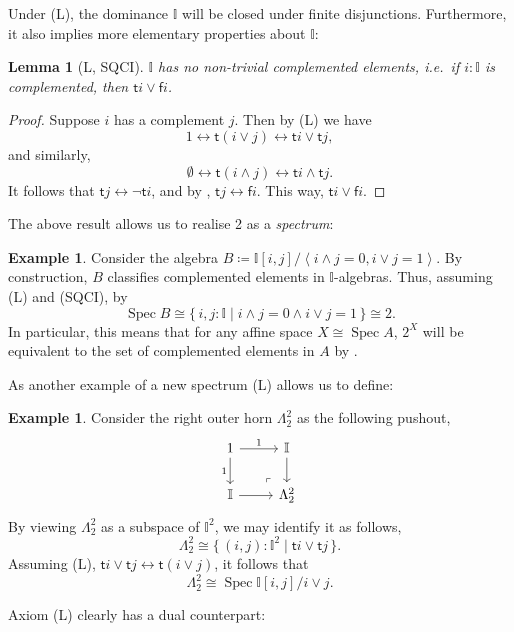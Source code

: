 \documentclass[a4paper,12pt]{amsart}
\newtheorem{lemma}[theorem]{Lemma}
\theoremstyle{definition}
\newtheorem{example}[theorem]{Example}
\newcommand{\mbb}[1]{\mathbb{#1}}
\newcommand{\I}{\mbb I}
\newcommand{\ms}[1]{\mathsf{#1}}
\newcommand{\pair}[1]{\left\langle#1\right\rangle}
\newcommand{\scomp}[2]{\{\,#1\mid#2\,\}}
\newcommand{\emp}{\emptyset}
\newcommand{\eq}{\leftrightarrow}
\newcommand{\spec}{\operatorname{Spec}}
\begin{document}
Under (L), the dominance $\I$ will be closed under finite disjunctions. Furthermore, it also implies more elementary properties about $\I$:

\begin{lemma}[L, SQCI]\label{lem:intisnotBoolean}
  $\I$ has no non-trivial complemented elements, i.e.\ if $i : \I$ is complemented, then $\ms ti \vee \ms fi$. 
\end{lemma}
\begin{proof}
  Suppose $i$ has a complement $j$. Then by (L) we have
  \[ 1 \eq \ms t(i \vee j) \eq \ms ti \vee \ms tj, \]
  and similarly,
  \[ \emp \eq \ms t(i \wedge j) \eq \ms ti \wedge \ms tj. \]
  It follows that $\ms tj \eq \neg \ms ti$, and by , $\ms tj \eq \ms fi$. This way, $\ms ti \vee \ms fi$.
\end{proof}

The above result allows us to realise 2 as a \emph{spectrum}:

\begin{example}\label{exm:2isaffine}
  Consider the algebra $B \coloneq \I[i,j]/\pair{i\wedge j =0,i\vee j = 1}$. By construction, $B$ classifies complemented elements in $\I$-algebras. Thus, assuming (L) and (SQCI), by 
  \[ \spec B \cong \scomp{i,j : \I}{i \wedge j = 0 \wedge i \vee j = 1} \cong 2. \]
  In particular, this means that for any affine space $X \cong \spec A$, $2^X$ will be equivalent to the set of complemented elements in $A$ by .
\end{example}

As another example of a new spectrum (L) allows us to define:

\begin{example}\label{exm:hornaffine}
  Consider the right outer horn $\Lambda^2_2$ as the following pushout,
  \[
    \begin{tikzcd}
      1 \ar[d, "1"'] \ar[r, "1"] & \I \ar[d] \\
      \I \ar[r] & \Lambda^2_2
      \arrow["\lrcorner"{anchor=center, pos=0.125, rotate=180}, draw=none, from=2-2, to=1-1]
    \end{tikzcd}
  \]
  By viewing $\Lambda^2_2$ as a subspace of $\I^2$, we may identify it as follows,
  \[ \Lambda^2_2 \cong \scomp{(i,j) : \I^2}{\ms ti \vee \ms tj}. \]
  Assuming (L), $\ms ti \vee \ms tj \eq \ms t(i\vee j)$, it follows that 
  \[ \Lambda^2_2 \cong \spec \I[i,j]/i \vee j. \]
\end{example}

Axiom (L) clearly has a dual counterpart:
\end{document}
